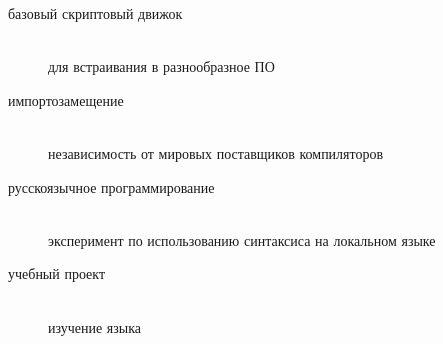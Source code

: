 \clearpage{}\label{intro}

\begin{description}
    \item[базовый скриптовый движок]\ \\для встраивания в разнообразное ПО
    \item[импортозамещение]\ \\независимость от мировых поставщиков компиляторов
    \item[русскоязычное программирование]\ \\эксперимент по использованию
    синтаксиса на локальном языке
    \item[учебный проект]\ \\изучение языка \D
\end{description}
